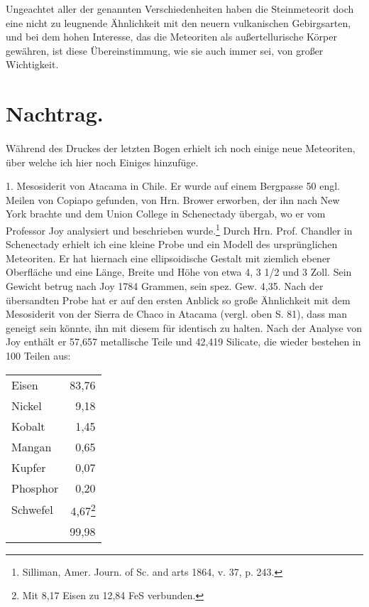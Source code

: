 \documentclass[a4paper, 11pt, oneside]{article}
\begin{document}
Ungeachtet aller der genannten Verschiedenheiten haben die Steinmeteorit doch eine nicht zu leugnende Ähnlichkeit mit den neuern vulkanischen Gebirgsarten, und bei dem hohen Interesse, das die Meteoriten als außertellurische Körper gewähren, ist diese Übereinstimmung, wie sie auch immer sei, von großer Wichtigkeit.
\clearpage
\section{Nachtrag.}
\paragraph{}
Während des Druckes der letzten Bogen erhielt ich noch einige neue Meteoriten, über welche ich hier noch Einiges hinzufüge.

1. Mesosiderit von Atacama in Chile. Er wurde auf einem Bergpasse 50 engl. Meilen von Copiapo gefunden, von Hrn. Brower erworben, der ihn nach New York brachte und dem Union College in Schenectady übergab, wo er vom Professor Joy analysiert und beschrieben wurde.\footnote{Silliman, Amer. Journ. of Sc. and arts 1864, v. 37, p. 243.} Durch Hrn. Prof. Chandler in Schenectady erhielt ich eine kleine Probe und ein Modell des ursprünglichen Meteoriten. Er hat hiernach eine ellipsoidische Gestalt mit ziemlich ebener Oberfläche und eine Länge, Breite und Höhe von etwa 4, 3 1/2 und 3 Zoll. Sein Gewicht betrug nach Joy 1784 Grammen, sein spez. Gew. 4,35. Nach der übersandten Probe hat er auf den ersten Anblick so große Ähnlichkeit mit dem Mesosiderit von der Sierra de Chaco in Atacama (vergl. oben S. 81), dass man geneigt sein könnte, ihn mit diesem für identisch zu halten. Nach der Analyse von Joy enthält er 57,657 metallische Teile und 42,419 Silicate, die wieder bestehen in 100 Teilen aus:
\begin{center}
\begin{tabular}{ l r }
    Eisen & 83,76\\
    Nickel & 9,18\\
    Kobalt & 1,45\\
    Mangan & 0,65\\
    Kupfer & 0,07\\
    Phosphor & 0,20\\
    Schwefel & 4,67\footnote{Mit 8,17 Eisen zu 12,84 FeS verbunden.}\\
     & 99,98\\
\end{tabular}
\end{center}
\end{document}
